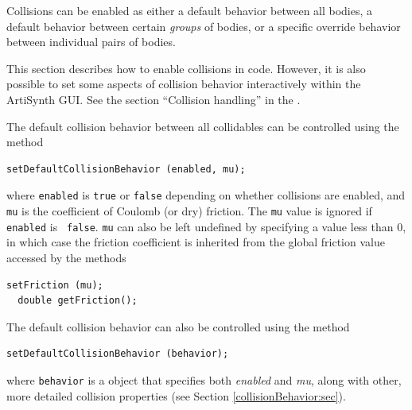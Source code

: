 Collisions can be enabled as either a default behavior between all
bodies, a default behavior between certain {\it groups} of bodies, or
a specific override behavior between individual pairs of bodies.

\begin{sideblock}
This section describes how to enable collisions in code. However,
it is also possible to set some aspects of collision behavior interactively
within the ArtiSynth GUI. See the section ``Collision handling'' in the
.
\end{sideblock}

The default collision behavior between all collidables can be
controlled using the method
%
\begin{lstlisting}[]
  setDefaultCollisionBehavior (enabled, mu);
\end{lstlisting}
%
where {\tt enabled} is {\tt true} or {\tt false} depending on whether
collisions are enabled, and {\tt mu} is the coefficient of Coulomb (or
dry) friction. The {\tt mu} value is ignored if {\tt enabled} is {\tt
false}. {\tt mu} can also be left undefined by specifying a value less
than 0, in which case the friction coefficient is inherited from the
global friction value accessed by the methods
%
\begin{lstlisting}[]
  setFriction (mu);
  double getFriction();
\end{lstlisting}
%
The default collision behavior can also be controlled
using the method
%
\begin{lstlisting}[]
  setDefaultCollisionBehavior (behavior);
\end{lstlisting}
%
where {\tt behavior} is a
 object that
specifies both {\it enabled} and {\it mu}, along with other, more
detailed collision properties (see Section
\ref{collisionBehavior:sec}).  

